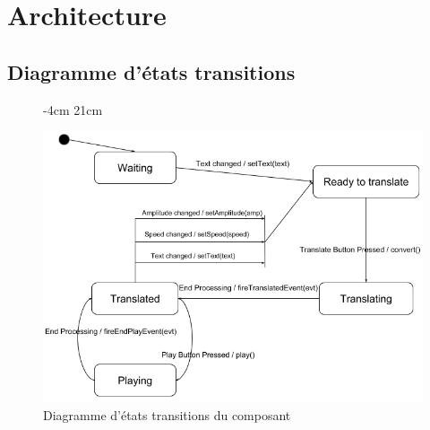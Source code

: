 \documentclass[a4paper,11pt]{article}
\begin{document}
    \section{Architecture}

    \subsection{Diagramme d'états transitions}
    \begin{figure}[H]
         -4cm 21cm
        \begin{center}
            \includegraphics[scale=0.8]{etatsdiag.png}
            \caption{Diagramme d'états transitions du composant}
            \label{Diagramme d'états transitions du composant}
        \end{center}
    \end{figure}
\end{document}
